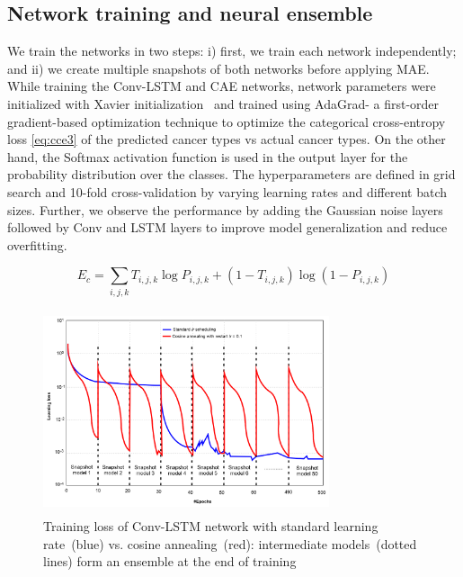 \subsection{Network training and neural ensemble} %
We train the networks in two steps: i) first, we train each network independently; and ii) we create multiple snapshots of both networks before applying MAE. While training the Conv-LSTM and CAE networks, network parameters were initialized with Xavier initialization~\cite{xavier} and trained using AdaGrad- a first-order gradient-based optimization technique to optimize the categorical cross-entropy loss \cref{eq:cce3} of the predicted cancer types vs actual cancer types. On the other hand, the Softmax activation function is used in the output layer for the probability distribution over the classes. The hyperparameters are defined in grid search and 10-fold cross-validation by varying learning rates and different batch sizes. Further, we observe the performance by adding the Gaussian noise layers followed by Conv and LSTM layers to improve model generalization and reduce overfitting. 

\vspace{-2mm}
\begin{equation} 
    E_{c} = \sum_{i, j, k} T_{i, j, k} \log P_{i, j, k}+\left(1-T_{i, j, k}\right) \log \left(1-P_{i, j, k}\right)
    \label{eq:cce3}
\end{equation} 

\begin{figure}
    \centering
    \includegraphics[width=0.75\textwidth,height=60mm]{images/ca.png}
    \caption{Training loss of Conv-LSTM network with standard learning rate~(blue) vs. cosine annealing~(red): intermediate models~(dotted lines) form an ensemble at the end of training~\cite{karimACCA2019}}
    \label{fig:ca}
    \vspace{-2mm}
\end{figure}

